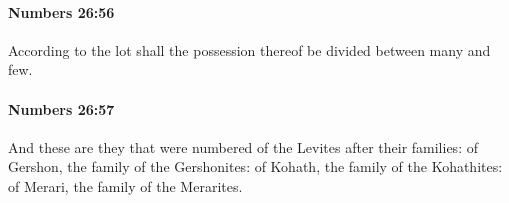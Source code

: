		\paragraph{Numbers 26:56} %
			\label{NUMBERS-26-56}

			According to the lot shall the possession thereof be divided between many and few.


		\paragraph{Numbers 26:57} %
			\label{NUMBERS-26-57}

			And these are they that were numbered of the Levites after their families: of Gershon, the family of the Gershonites: of Kohath, the family of the Kohathites: of Merari, the family of the Merarites.


